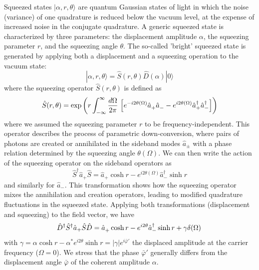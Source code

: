 Squeezed states $|\alpha, r, \theta\rangle $ are quantum Gaussian states of light in which the noise (variance) of one quadrature is reduced below the vacuum level, at the expense of increased noise in the conjugate quadrature. A generic squeezed state is characterized by three parameters: the displacement amplitude $\alpha$, the squeezing parameter $r$, and the squeezing angle $\theta$. The so-called 'bright' squeezed state is generated by applying both a displacement and a squeezing operation to the vacuum state: 
\begin{equation}
  |\alpha, r, \theta\rangle = \hat{S}(r, \theta)\hat{D}(\alpha)|0\rangle
\end{equation}
where the squeezing operator $\hat{S}(r, \theta)$ is defined as
\begin{equation}
\hat{S}(r, \theta) = \exp\left( r \int^{\infty}_{-\infty} \dfrac{d\Omega}{2\pi} \,\left[ e^{- i 2\theta(\Omega)} \hat{a}^{\vphantom{\dagger}}_+ \hat{a}^{\vphantom{\dagger}}_- - e^{ i 2\theta(\Omega)} \hat{a}^\dagger_+ \hat{a}^\dagger_- \right] \right)
\end{equation}
where we assumed the squeezing parameter $r$ to be frequency-independent. This operator describes the process of parametric down-conversion, where pairs of photons are created or annihilated in the sideband modes $\hat{a}_\pm$ with a phase relation determined by the squeezing angle $\theta(\Omega)$. We can then write the action of the squeezing operator on the sideband operators as
\begin{equation}
\hat{S}^\dagger \hat{a}_+ \hat{S} = \hat{a}_+ \cosh r - e^{i 2\theta(\Omega)} \hat{a}^\dagger_- \sinh r
\end{equation}
and similarly for $\hat{a}_-$. This transformation shows how the squeezing operator mixes the annihilation and creation operators, leading to modified quadrature fluctuations in the squeezed state. Applying both transformations (displacement and squeezing) to the field vector, we have
\begin{equation}
\hat{D}^\dagger \hat{S}^\dagger \hat{a}_+ \hat{S} \hat{D} = \hat{a}^{\vphantom{\dagger}}_+ \cosh r - e^{i 2\theta} \hat{a}^\dagger_- \sinh r + \gamma \delta (\Omega) \, \label{II.26}
\end{equation}
with $\gamma = \alpha \cosh r - \alpha^* e^{i 2\theta} \sinh r = |\gamma|e^{i\bar{\varphi}'}$ the displaced amplitude at the carrier frequency ($\Omega=0$). We stress that the phase $\bar{\varphi}'$ generally differs from the displacement angle $\bar{\varphi}$ of the coherent amplitude $\alpha$. \\ 

